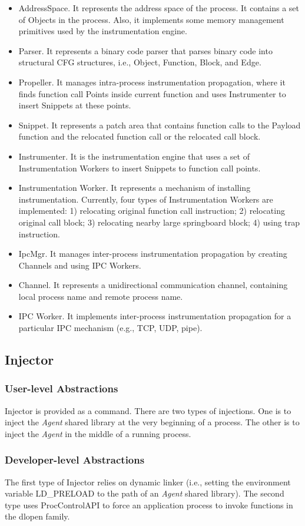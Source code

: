 \begin{itemize}
\item AddressSpace. It represents the address space of the process. It contains
  a set of Objects in the process. Also, it implements some memory management
  primitives used by the instrumentation engine.
\item Parser. It represents a binary code parser that parses binary code into
  structural CFG structures, i.e., Object, Function, Block, and Edge.
\item Propeller. It manages intra-process instrumentation propagation, where it
  finds function call Points inside current function and uses Instrumenter to
  insert Snippets at these points.
\item Snippet. It represents a patch area that contains function calls to the
  Payload function and the relocated function call or the relocated call block.
\item Instrumenter. It is the instrumentation engine that uses a set of
  Instrumentation Workers to insert Snippets to function call points.
\item Instrumentation Worker. It represents a mechanism of installing
  instrumentation. Currently, four types of Instrumentation Workers are
  implemented: 1) relocating original function call instruction; 2) relocating
  original call block; 3) relocating nearby large springboard block; 4) using
  trap instruction.
\item IpcMgr. It manages inter-process instrumentation propagation by creating
  Channels and using IPC Workers.
\item Channel. It represents a unidirectional communication channel, containing
  local process name and remote process name.
\item IPC Worker. It implements inter-process instrumentation propagation for a
  particular IPC mechanism (e.g., TCP, UDP, pipe).
\end{itemize}

\subsection{Injector}
\subsubsection{User-level Abstractions}

Injector is provided as a command. 
There are two types of injections.
One is to inject the {\em Agent} shared library at the very beginning of a
process.
The other is to inject the {\em Agent} in the middle of a running process.

\subsubsection{Developer-level Abstractions}

The first type of Injector relies on dynamic linker (i.e., setting the
environment variable LD\_PRELOAD to the path of an {\em Agent} shared library).
The second type uses ProcControlAPI to force an application process to invoke
functions in the dlopen family.
